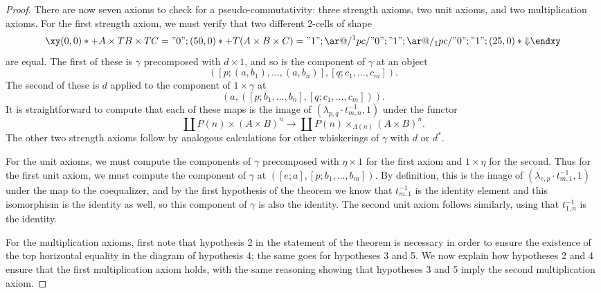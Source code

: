 \documentclass{amsbook} %
\numberwithin{section}{chapter}
\begin{document}
\begin{proof}
There are now seven axioms to check for a pseudo-commutativity:  three strength axioms, two unit axioms, and two multiplication axioms.  For the first strength axiom, we must verify that two different 2-cells of shape
  \[
    \xy
      (0,0)*+{A \times TB \times TC}="0";
      (50,0)*+{T(A \times B \times C)}="1";
      {\ar@/^1pc/ "0"; "1"};
      {\ar@/_1pc/ "0"; "1"};
      (25,0)*{\Downarrow}
    \endxy
  \]
are equal.  The first of these is $\gamma$ precomposed with $d \times 1$, and so is the component of $\gamma$ at an object
  \[
    \left( [p;(a,b_1),\ldots,(a,b_n)], [q; c_{1}, \ldots, c_{m}] \right).
  \]
The second of these is $d$ applied to the component of $1 \times \gamma$ at
  \[
    \left(a, ([p;b_1,\ldots,b_n], [q; c_{1}, \ldots, c_{m}]) \right).
  \]
It is straightforward to compute that each of these maps is the image of $\left(\lambda_{p,q}\cdot t_{m,n}^{-1},1\right)$ under the functor
  \[
    \coprod P(n) \times (A \times B)^{n} \rightarrow \coprod P(n) \times_{\Lambda(n)} (A \times B)^{n}.
  \]
The other two strength axioms follow by analogous calculations for other whiskerings of $\gamma$ with $d$ or $d^{*}$.


For the unit axioms, we must compute the components of $\gamma$ precomposed with $\eta \times 1$ for the first axiom and $1 \times \eta$ for the second.  Thus for the first unit axiom, we must compute the component of $\gamma$ at $\left( [e;a], [p; b_{1}, \ldots, b_{m}] \right)$.  By definition, this is the image of $(\lambda_{e,p}\cdot t^{-1}_{m,1}, 1)$ under the map to the coequalizer, and by the first hypothesis of the theorem we know that $t^{-1}_{m,1}$ is the identity element and this isomorphism is the identity as well, so this component of $\gamma$ is also the identity.  The second unit axiom follows similarly, using that $t^{-1}_{1,n}$ is the identity.


For the multiplication axioms, first note that hypothesis 2 in the statement of the theorem is necessary in order to ensure the existence of the top horizontal equality in the diagram of hypothesis 4; the same goes for hypotheses 3 and 5. We now explain how hypotheses 2 and 4 ensure that the first multiplication axiom holds, with the same reasoning showing that hypotheses 3 and 5 imply the second multiplication axiom.


\end{proof}
\end{document}
